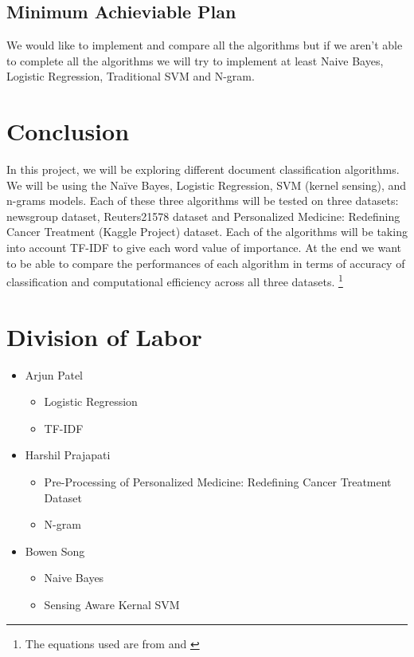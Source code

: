 \documentclass[10pt,twocolumn,letterpaper]{article}
\newcommand\blfootnote[1]{%
	\begingroup
	\renewcommand\thefootnote{}\footnote{#1}%
	\addtocounter{footnote}{-1}%
	\endgroup
}
\begin{document}
\subsection{Minimum Achieviable Plan}
We would like to implement and compare all the algorithms but if we aren't able to complete all the algorithms we will try to implement at least Naive Bayes, Logistic Regression, Traditional SVM and N-gram.


\section{Conclusion}
In this project, we will be exploring different document classification algorithms. We will be using the Naïve Bayes, Logistic Regression, SVM (kernel sensing), and n-grams models. Each of these three algorithms will be tested on three datasets: newsgroup dataset, Reuters21578 dataset and Personalized Medicine: Redefining Cancer Treatment (Kaggle Project) dataset. Each of the algorithms will be taking into account TF-IDF to give each word value of importance. At the end we want to be able to compare the performances of each algorithm in terms of accuracy of classification and computational efficiency across all three datasets. 
\blfootnote{The equations used are from \cite{ishwarspring18} and \cite{song1999general} }

\newpage
\section*{Division of Labor}
\begin{itemize}
	\item  Arjun Patel
	\begin{itemize}
		\item Logistic Regression
		\item TF-IDF
	\end{itemize}
	\item  Harshil Prajapati
	\begin{itemize}
		\item Pre-Processing of Personalized Medicine: Redefining Cancer Treatment Dataset
		\item N-gram
	\end{itemize}
	\item Bowen Song
	\begin{itemize}
		\item Naive Bayes 
		\item Sensing Aware Kernal SVM
	\end{itemize}
\end{itemize}

{\small


}
\end{document}
